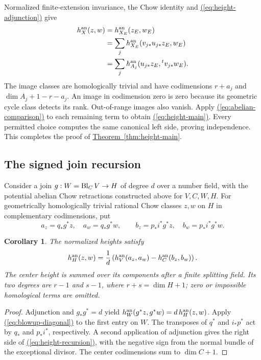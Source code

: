 \documentclass[11pt,a4paper]{article}
\newtheorem{corollary}[theorem]{Corollary}
\theoremstyle{definition}
\theoremstyle{remark}\newtheorem{remark}[theorem]{Remark}
\numberwithin{equation}{section}
\newcommand{\thmref}[1]{\hyperref[#1]{\textcolor{resultlink}{Theorem~\ref*{#1}}}}
\renewcommand{\eqref}[1]{\hyperref[#1]{\textcolor{equationlink}{(\ref*{#1})}}}
\begin{document}
Normalized finite-extension invariance, the Chow identity and
\eqref{eq:height-adjunction} give
\begin{align*}
 h_X^{\mathrm{an}}(z,w)
 &=h_{X_E}^{\mathrm{an}}(z_E,w_E)\\
 &=\sum_jh_{X_E}^{\mathrm{an}}(v_{j*}u_{j*}z_E,w_E)\\
 &=\sum_jh_{A_j}^{\mathrm{an}}(u_{j*}z_E,{}^tv_{j*}w_E).
\end{align*}
The image classes are homologically trivial and have codimensions
$r+a_j$ and $\dim A_j+1-r-a_j$. An image in codimension zero
is zero because its geometric cycle class detects its rank.
Out-of-range images also vanish. Apply
\eqref{eq:abelian-comparison} to each remaining term to obtain
\eqref{eq:height-main}. Every permitted choice computes the
same canonical left side, proving independence. This completes
the proof of \thmref{thm:height-main}.

\subsection{The signed join recursion}

Consider a join $g:W=\operatorname{Bl}_CV\to H$ of degree $d$ over a number
field, with the potential abelian Chow retractions constructed above
for $V,C,W,H$. For geometrically homologically trivial rational
Chow classes $z,w$ on $H$ in complementary codimensions, put
\[
 a_z=q_*g^*z,\quad a_w=q_*g^*w,\qquad
 b_z=p_*i^*g^*z,\quad b_w=p_*i^*g^*w.
\]

\begin{corollary}\label{cor:height-recursion}
The normalized heights satisfy
\begin{equation}\label{eq:height-recursion}
 h_H^{\mathrm{an}}(z,w)=\frac1d
          \left(h_V^{\mathrm{an}}(a_z,a_w)-h_C^{\mathrm{an}}(b_z,b_w)\right).
\end{equation}
The center height is summed over its components after a finite
splitting field. Its two degrees are $r-1$ and $s-1$, where
$r+s=\dim H+1$; zero or impossible homological terms are omitted.
\end{corollary}

\begin{proof}
Adjunction and $g_*g^*=d$ yield
$h_W^{\mathrm{an}}(g^*z,g^*w)=d\,h_H^{\mathrm{an}}(z,w)$. Apply
\eqref{eq:blowup-diagonal} to the first entry on $W$.
The transposes of $q^*$ and $i_*p^*$ act by $q_*$ and
$p_*i^*$, respectively. A second application of adjunction
gives the right side of \eqref{eq:height-recursion}, with
the negative sign from the normal bundle of the exceptional
divisor. The center codimensions sum to $\dim C+1$.
\end{proof}
\end{document}
